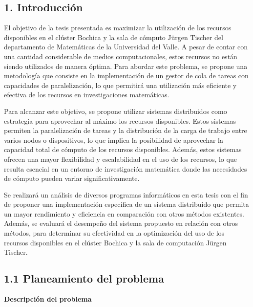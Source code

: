 \begin{spacing}{1.5}
  \begin{tightcenter}
    \section{1. Introducción}
    \mylinespacing
  \end{tightcenter}

  El objetivo de la tesis presentada es maximizar la utilización de los
  recursos disponibles en el clúster Bochica y la sala de cómputo Jürgen Tischer
  del departamento de Matemáticas de la Universidad del Valle. A pesar de contar
  con una cantidad considerable de medios computacionales, estos recursos no
  están siendo utilizados de manera óptima. Para abordar este problema, se
  propone una metodología que consiste en la implementación de un gestor de cola
  de tareas con capacidades de paralelización, lo que permitirá una utilización
  más eficiente y efectiva de los recursos en investigaciones matemáticas.

  Para alcanzar este objetivo, se propone utilizar sistemas distribuidos como
  estrategia para aprovechar al máximo los recursos disponibles. Estos sistemas
  permiten la paralelización de tareas y la distribución de la carga de trabajo
  entre varios nodos o dispositivos, lo que implica la posibilidad de aprovechar
  la capacidad total de cómputo de los recursos disponibles. Además, estos
  sistemas ofrecen una mayor flexibilidad y escalabilidad en el uso de los
  recursos, lo que resulta esencial en un entorno de investigación matemática
  donde las necesidades de cómputo pueden variar significativamente.

  Se realizará un análisis de diversos programas informáticos en esta tesis con
  el fin de proponer una implementación específica de un sistema distribuido que
  permita un mayor rendimiento y eficiencia en comparación con otros métodos
  existentes. Además, se evaluará el desempeño del sistema propuesto en relación
  con otros métodos, para determinar su efectividad en la optimización del uso de
  los recursos disponibles en el clúster Bochica y la sala de computación Jürgen
  Tischer.

  \subsection{1.1 Planeamiento del problema}

  \textbf{Descripción del problema}


\end{spacing}
